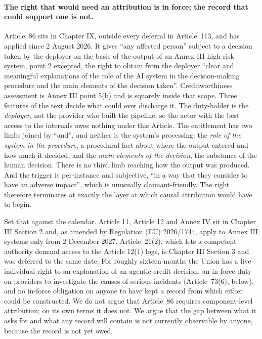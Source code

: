 \documentclass[11pt]{article}
\theoremstyle{remark}
\begin{document}
\paragraph{The right that would need an attribution is in force; the record that
could support one is not.} Article~86 sits in Chapter IX, outside every deferral
in Article~113, and has applied since 2 August 2026. It gives ``any affected
person'' subject to a decision taken by the deployer on the basis of the output
of an Annex III high-risk system, point 2 excepted, the right to obtain from the
deployer ``clear and meaningful explanations of the role of the AI system in the
decision-making procedure and the main elements of the decision taken''.
Creditworthiness assessment is Annex III point 5(b) and is squarely inside that
scope. Three features of the text decide what could ever discharge it. The
duty-holder is the \emph{deployer}, not the provider who built the pipeline, so
the actor with the best access to the internals owes nothing under this Article.
The entitlement has two limbs joined by ``and'', and neither is the system's
processing: the \emph{role of the system in the procedure}, a procedural fact
about where the output entered and how much it decided, and the \emph{main
elements of the decision}, the substance of the human decision. There is no
third limb reaching how the output was produced. And the trigger is
per-instance and subjective, ``in a way that they consider to have an adverse
impact'', which is unusually claimant-friendly. The right therefore terminates at
exactly the layer at which causal attribution would have to begin.

Set that against the calendar. Article 11, Article 12 and Annex IV sit in
Chapter III Section 2 and, as amended by Regulation (EU) 2026/1744, apply to
Annex III systems only from 2 December 2027. Article~21(2), which lets a
competent authority demand access to the Article 12(1) logs, is Chapter III
Section 3 and was deferred to the same date. For roughly sixteen months the
Union has a live individual right to an explanation of an agentic credit
decision, an in-force duty on providers to investigate the causes of serious
incidents (Article~73(6), below), and no in-force obligation on anyone to have
kept a record from which either could be constructed. We do not argue that
Article~86 requires component-level attribution; on its own terms it does not.
We argue that the gap between what it asks for and what any record will contain
is not currently observable by anyone, because the record is not yet owed.
\end{document}
